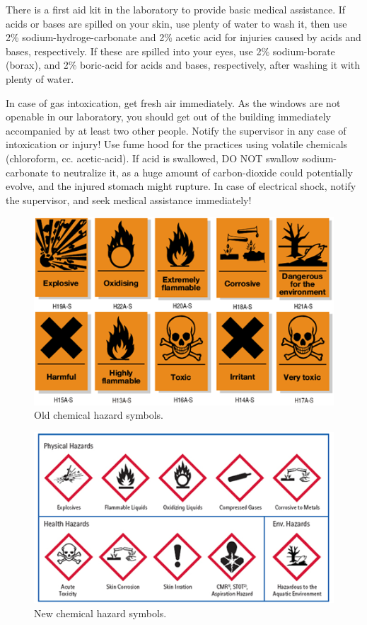 There is a first aid kit in the laboratory to provide basic medical assistance. If acids or bases are spilled on your skin, use plenty of water to wash it, then use 2\% sodium-hydroge-carbonate and 2\% acetic acid for injuries caused by acids and bases, respectively. If these are spilled into your eyes, use 2\% sodium-borate (borax), and 2\% boric-acid for acids and bases, respectively, after washing it with plenty of water. 

In case of gas intoxication, get fresh air immediately. As the windows are not openable in our laboratory, you should get out of the building immediately accompanied by at least two other people. Notify the supervisor in any case of intoxication or injury! Use fume hood for the practices using volatile chemicals (chloroform, cc. acetic-acid). If acid is swallowed, DO NOT swallow sodium-carbonate to neutralize it, as a huge amount of carbon-dioxide could potentially evolve, and the injured stomach might rupture. In case of electrical shock, notify the supervisor, and seek medical assistance immediately!


\begin{figure}
  \centering
  \includegraphics[width=1\textwidth]{fig/old_hazard.png}
  \caption{Old chemical hazard symbols.}
\end{figure}


\begin{figure}
  \centering
  \includegraphics[width=1\textwidth]{fig/new_hazard.png}
  \caption{New chemical hazard symbols.}
\end{figure}
